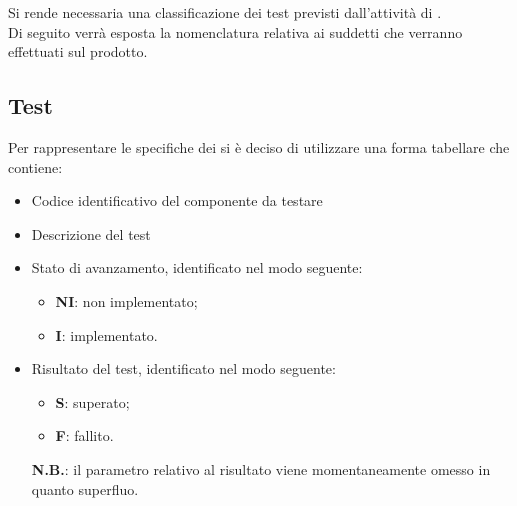 \documentclass[]{article}
\begin{document}
		Si rende necessaria una classificazione dei test previsti dall'attività di .\\ Di seguito verrà esposta la nomenclatura relativa ai suddetti  che verranno effettuati sul prodotto.
		
		\subsection{Test}
		
		Per rappresentare le specifiche dei  si è deciso di utilizzare una forma tabellare che contiene:
		\begin{itemize}
			\item Codice identificativo del componente da testare
			\item Descrizione del test
			\item Stato di avanzamento, identificato nel modo seguente:
				\begin{itemize}
					\item \textbf{NI}: non implementato;
					\item \textbf{I}: implementato.						
				\end{itemize}		
			\item Risultato del test, identificato nel modo seguente:
				\begin{itemize}
					\item \textbf{S}: superato;
					\item \textbf{F}: fallito.
				\end{itemize}
				\textbf{N.B.}: il parametro relativo al risultato viene momentaneamente omesso in quanto superfluo.						 
		\end{itemize}				
		
\end{document}
